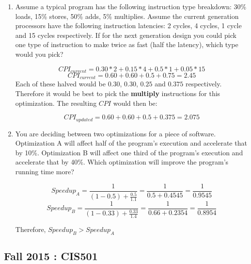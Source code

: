 \documentclass[12pt]{article}
\newenvironment{QandA}{\begin{enumerate}[label=\bfseries\arabic*.]\bfseries}
                      {\end{enumerate}}
\newenvironment{answered}{\par\quad\normalfont}{}
\begin{document}
\begin{QandA}
   \item Assume a typical program has the following instruction type breakdown: 30\% loads, 15\% stores, 50\% adds, 5\% multiplies. Assume the current generation processors have the following instruction latencies: 2 cycles, 4 cycles, 1 cycle and 15 cycles respectively. If for the next generation design you could pick one type of instruction to make twice as fast (half the latency), which type would you pick?
        \begin{answered}
        \begin{equation*}
            CPI_{current} = 0.30 * 2 + 0.15 * 4 + 0.5 * 1 + 0.05 * 15
        \end{equation*}
        \begin{equation*}
            CPI_{current} = 0.60 + 0.60 + 0.5 + 0.75 = 2.45
        \end{equation*}
        Each of these halved would be $0.30$, $0.30$, $0.25$ and $0.375$ respectively. Therefore it would be best to pick the \textbf{multiply} instructions for this optimization. The resulting $CPI$ would then be:
        
        \begin{equation*}
            CPI_{updated} = 0.60 + 0.60 + 0.5 + 0.375 = 2.075
        \end{equation*}
        \end{answered}
        
    \item You are deciding between two optimizations for a piece of software. Optimization A will affect half of the program's execution and accelerate that by 10\%. Optimization B will affect one third of the program's execution and accelerate that by 40\%. Which optimization will improve the program's running time more?
    
    \begin{equation*}
        Speedup_{A} = \frac{1}{(1-0.5) + \frac{0.5}{1.1}} = \frac{1}{0.5 + 0.4545} = \frac{1}{0.9545}
    \end{equation*}
    \begin{equation*}
        Speedup_{B} = \frac{1}{(1-0.33) + \frac{0.33}{1.4}} = \frac{1}{0.66 + 0.2354} = \frac{1}{0.8954}
    \end{equation*}    
    
    Therefore, $Speedup_{B} > Speedup_{A}$
\end{QandA}

\subsection{Fall 2015 : CIS501}
\end{document}

